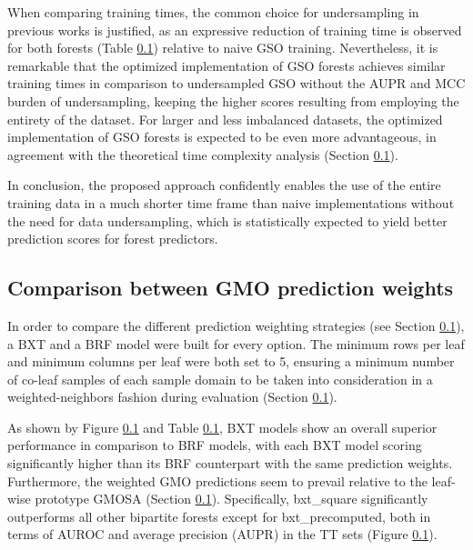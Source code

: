 \documentclass[conference]{IEEEtran}
\begin{document}

When comparing training times, the common choice for undersampling in previous works is justified, as an expressive reduction of training time is observed for both forests (Table \ref{}) relative to naive GSO training. Nevertheless, it is remarkable that the optimized implementation of GSO forests achieves similar training times in comparison to undersampled GSO without the AUPR and MCC burden of undersampling, keeping the higher scores resulting from employing the entirety of the dataset. For larger and less imbalanced datasets, the optimized implementation of GSO forests is expected to be even more advantageous, in agreement with the theoretical time complexity analysis (Section \ref{}).

\begin{table}[h]
    
\end{table}

In conclusion, the proposed approach confidently enables the use of the entire training data in a much shorter time frame than naive implementations without the need for data undersampling, which is statistically expected to yield better prediction scores for forest predictors.


\subsection{Comparison between GMO prediction weights}

In order to compare the different prediction weighting strategies (see Section \ref{}), a BXT and a BRF model were built for every option. The minimum rows per leaf and minimum columns per leaf were both set to 5, ensuring a minimum number of co-leaf samples of each sample domain to be taken into consideration in a weighted-neighbors fashion during evaluation (Section \ref{}).

As shown by Figure \ref{} and Table \ref{}, BXT models show an overall superior performance in comparison to BRF models, with each BXT model scoring significantly higher than its BRF counterpart with the same prediction weights. Furthermore, the weighted GMO predictions seem to prevail relative to the leaf-wise prototype GMOSA (Section \ref{}). Specifically, bxt\_square significantly outperforms all other bipartite forests except for bxt\_precomputed, both in terms of AUROC and average precision (AUPR) in the TT sets (Figure \ref{}).
\end{document}
